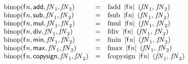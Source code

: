 $$
\begin{array}{@{}lcl@{}l@{}}
{\mathrm{binop}}({\mathsf{f}}{{\mathit{n}}}, \mathsf{add}, {\mathit{fN}}_{{1}}, {\mathit{fN}}_{{2}}) &=& {\mathrm{fadd}}~\,{|{\mathsf{f}}{{\mathit{n}}}|}~\,({\mathit{fN}}_{{1}},\, {\mathit{fN}}_{{2}}) &  \\
{\mathrm{binop}}({\mathsf{f}}{{\mathit{n}}}, \mathsf{sub}, {\mathit{fN}}_{{1}}, {\mathit{fN}}_{{2}}) &=& {\mathrm{fsub}}~\,{|{\mathsf{f}}{{\mathit{n}}}|}~\,({\mathit{fN}}_{{1}},\, {\mathit{fN}}_{{2}}) &  \\
{\mathrm{binop}}({\mathsf{f}}{{\mathit{n}}}, \mathsf{mul}, {\mathit{fN}}_{{1}}, {\mathit{fN}}_{{2}}) &=& {\mathrm{fmul}}~\,{|{\mathsf{f}}{{\mathit{n}}}|}~\,({\mathit{fN}}_{{1}},\, {\mathit{fN}}_{{2}}) &  \\
{\mathrm{binop}}({\mathsf{f}}{{\mathit{n}}}, \mathsf{div}, {\mathit{fN}}_{{1}}, {\mathit{fN}}_{{2}}) &=& {\mathrm{fdiv}}~\,{|{\mathsf{f}}{{\mathit{n}}}|}~\,({\mathit{fN}}_{{1}},\, {\mathit{fN}}_{{2}}) &  \\
{\mathrm{binop}}({\mathsf{f}}{{\mathit{n}}}, \mathsf{min}, {\mathit{fN}}_{{1}}, {\mathit{fN}}_{{2}}) &=& {\mathrm{fmin}}~\,{|{\mathsf{f}}{{\mathit{n}}}|}~\,({\mathit{fN}}_{{1}},\, {\mathit{fN}}_{{2}}) &  \\
{\mathrm{binop}}({\mathsf{f}}{{\mathit{n}}}, \mathsf{max}, {\mathit{fN}}_{{1}}, {\mathit{fN}}_{{2}}) &=& {\mathrm{fmax}}~\,{|{\mathsf{f}}{{\mathit{n}}}|}~\,({\mathit{fN}}_{{1}},\, {\mathit{fN}}_{{2}}) &  \\
{\mathrm{binop}}({\mathsf{f}}{{\mathit{n}}}, \mathsf{copysign}, {\mathit{fN}}_{{1}}, {\mathit{fN}}_{{2}}) &=& {\mathrm{fcopysign}}~\,{|{\mathsf{f}}{{\mathit{n}}}|}~\,({\mathit{fN}}_{{1}},\, {\mathit{fN}}_{{2}}) &  \\
\end{array}
$$

